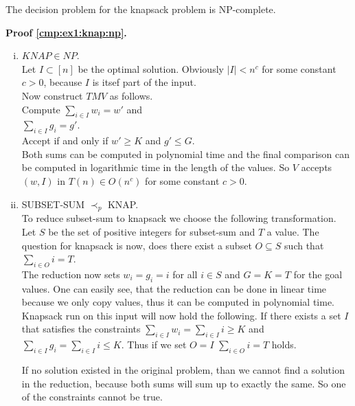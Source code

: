 \begin{lemma}\label{cmp:ex1:knap:np}
The decision problem for the knapsack problem is NP-complete.
\end{lemma}
\textbf{Proof \ref{cmp:ex1:knap:np}.}\\
\begin{enumerate}[i)]
    \item $KNAP \in NP$.\\
        Let $I \subset [n]$ be the optimal solution. Obviously $|I| < n^c$ for some constant $c>0$,
        because $I$ is itsef part of the input.\\
        Now construct $TM V$ as follows.\\
        Compute $\underset{i \in I}{\sum} w_i = w'$ and\\
        $\underset{i \in I}{\sum} g_i = g'$.\\
        Accept if and only if $w' \geq K$ and $ g' \leq G$.\\

        Both sums can be computed in polynomial time and the final comparison can be computed
        in logarithmic time in the length of the values.
        So $V$ accepts $(w,I)$ in $T(n) \in O(n^c)$ for some constant $c>0$.

    \item SUBSET-SUM $\prec_p$ KNAP.\\
        To reduce subset-sum to knapsack we choose the following transformation. Let $S$ be the set of
        positive integers for subset-sum and $T$ a value. The question for knapsack is now, does there exist
        a subset $O \subseteq S$ such that $\underset{i \in O}{\sum} i = T$.\\

        The reduction now sets $w_i = g_i = i$ for all $i \in S$ and $G = K = T$ for the goal values. One can
        easily see, that the reduction can be done in linear time because we only copy values, thus it can be computed in polynomial time. \\

        Knapsack run on this input will now hold the following. If there exists a set $I$ that satisfies the constraints
        $\underset{ i \in I}{\sum} w_i = \underset{i \in I}{\sum} i \geq K$ and $\underset{i \in I}{\sum} g_i = \underset{i \in I}{\sum} i \leq K$.
        Thus if we set $O = I$ $\underset{i \in O}{\sum} i = T$ holds.

        If no solution existed in the original problem, than we cannot find a solution in the reduction, because both sums
        will sum up to exactly the same. So one of the constraints cannot be true.
\end{enumerate}


